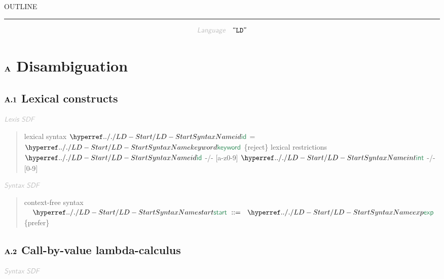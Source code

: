 


    OUTLINE
  \tableofcontents
\begin{center}
\rule{3in}{0.4pt}
\end{center}

\begin{displaymath}
\KEY{Language} \quad \STRING{LD}
\end{displaymath}

\section{$\SECT{A}$ Disambiguation}\hypertarget{secta-disambiguation}{}\label{secta-disambiguation}

\subsection{$\SECT{A.1}$ Lexical constructs}\hypertarget{secta1-lexical-constructs}{}\label{secta1-lexical-constructs}

$\KEY{Lexis SDF}$

\begin{quote}
lexical syntax\newline
     $\SHADE{\SYNHYPER{../.}{LD-Start}{id}}$ = $\SHADE{\SYNHYPER{../.}{LD-Start}{keyword}}$ \{reject\}\newline
   \newline
   lexical restrictions\newline
     $\SHADE{\SYNHYPER{../.}{LD-Start}{id}}$  -/- {[}a-z0-9{]}\newline
     $\SHADE{\SYNHYPER{../.}{LD-Start}{int}}$ -/- {[}0-9{]}
\end{quote}

$\KEY{Syntax SDF}$

\begin{quote}
context-free syntax\newline
   $\SHADE{\quad\SYNHYPER{../.}{LD-Start}{start}  \ ::= \  \  \SYNHYPER{../.}{LD-Start}{exp}}$ \{prefer\}
\end{quote}

\subsection{$\SECT{A.2}$ Call-by-value lambda-calculus}\hypertarget{secta2-call-by-value-lambda-calculus}{}\label{secta2-call-by-value-lambda-calculus}

$\KEY{Syntax SDF}$

